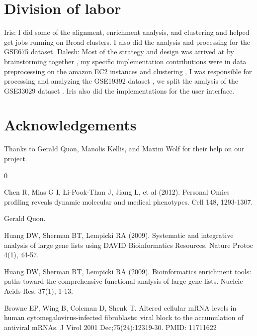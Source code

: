 \documentclass[aps,prd,final,onecolumn,a4paper,10pt]{revtex4}
\begin{document}
\section{Division of labor}

Iris: I did some of the alignment, enrichment analysis, and clustering and helped get jobs running on Broad clusters. I also did the analysis and processing for the GSE675 dataset.
Dalesh: Most of the strategy and design was arrived at by brainstorming together , my specific implementation contributions were in data preprocessing on the amazon EC2 instances and clustering , I was responsible for processing and analyzing the GSE19392 dataset , we split the analysis of the GSE33029 dataset . Iris also did the implementations for the user interface.

\section{Acknowledgements}
Thanks to Gerald Quon, Manolis Kellis, and Maxim Wolf for their help on our project.

\begin{thebibliography} {0}

 Chen R, Mias G I, Li-Pook-Than J, Jiang L, et al (2012). Personal Omics profiling reveals dynamic molecular and medical phenotypes. Cell 148, 1293-1307.

 Gerald Quon.

 Huang DW, Sherman BT, Lempicki RA (2009). Systematic and integrative analysis of large gene lists using DAVID Bioinformatics Resources. Nature Protoc 4(1), 44-57.

 Huang DW, Sherman BT, Lempicki RA (2009). Bioinformatics enrichment tools: paths toward the comprehensive functional analysis of large gene lists. Nucleic Acids Res. 37(1), 1-13.

 Browne EP, Wing B, Coleman D, Shenk T. Altered cellular mRNA levels in human cytomegalovirus-infected fibroblasts: viral block to the accumulation of antiviral mRNAs. J Virol 2001 Dec;75(24):12319-30. PMID: 11711622


\end{thebibliography}
\end{document}
